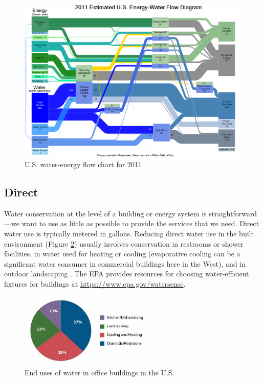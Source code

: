\documentclass[10pt]{article}
\begin{document}
            \begin{figure}[h]
            \includegraphics[width=6.5in]{extras18/energy-watersankey.png}
            \caption{U.S. water-energy flow chart for 2011 \cite{waterenergynexus}}
            \label{sankey}
            \end{figure}



\subsection{Direct}


Water conservation at the level of a building or energy system is straightforward---we want to use as little as possible to provide the services that we need. Direct water use is typically metered in gallons. 
Reducing direct water use in the built environment (Figure \ref{weu}) usually involves conservation in restrooms or shower facilities, in water used for heating or cooling (evaporative cooling can be a significant water consumer in commercial buildings here in the West), and in outdoor landscaping \cite{noauthor_2012-sd}. The EPA provides resources for choosing water-efficient fixtures for buildings  at \url{https://www.epa.gov/watersense}.

\begin{figure}[h]
\centering
\includegraphics[width=2.5in]{extras18/weucb.jpg}
\caption{End uses of water in office buildings in the U.S. \cite{eGRIDsupportdoc2016}}
\label{weu}
\end{figure}
\end{document}
